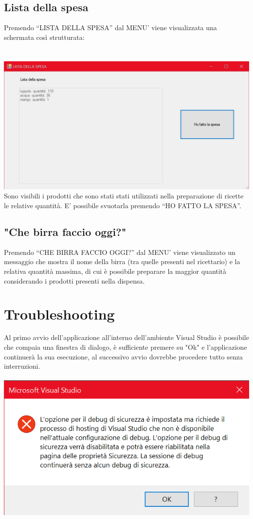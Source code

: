 \documentclass[a4paper, titlepage]{article}
\begin{document}
\subsection{Lista della spesa}
Premendo “LISTA DELLA SPESA” dal MENU’ viene visualizzata una schermata così strutturata:\\\\\
\includegraphics[scale=0.30]{Immagini/form/Form ListaSpesa.jpg}
\\Sono visibili i prodotti che sono stati stati utilizzati nella preparazione di ricette le relative quantità. E’ possibile svuotarla premendo “HO FATTO LA SPESA”.
\subsection{"Che birra faccio oggi?"}
Premendo “CHE BIRRA FACCIO OGGI?” dal MENU’ viene visualizzato un messaggio che mostra il nome della birra (tra quelle presenti nel ricettario)  e la relativa quantità massima, di cui è possibile preparare la maggior quantità considerando i prodotti presenti nella dispensa.

\section{Troubleshooting}
Al primo avvio dell'applicazione all'interno dell'ambiente  Visual Studio è possibile che compaia una finestra di dialogo, è sufficiente premere su "Ok" e l'applicazione continuerà la sua esecuzione, al successivo avvio dovrebbe procedere tutto senza interruzioni.\\\\
\includegraphics[scale=0.60]{Immagini/Finestra di dialogo.png}
\newpage
\end{document}
